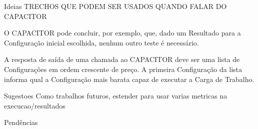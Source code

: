 Ideias
  TRECHOS QUE PODEM SER USADOS QUANDO FALAR DO CAPACITOR

  O CAPACITOR pode
  concluir, por exemplo, que, dado um Resultado para a Configuração inicial 
  escolhida, nenhum outro teste é necessário.

  A resposta de saída de uma chamada ao CAPACITOR deve ser uma lista de Configurações 
  em ordem crescente de preço. A primeira Configuração da lista informa qual a
  Configuração mais barata capaz de executar a Carga de Trabalho.

Sugestoes
  Como trabalhos futuros, estender para usar varias metricas na execucao/resultados
  
Pendências
